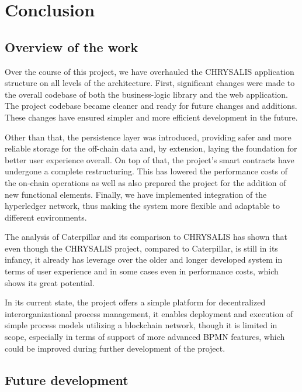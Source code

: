 %
\chapter{Conclusion}
\label{sec:conclusion}

\section{Overview of the work}
\label{sec:conclusion:overview}
Over the course of this project, we have overhauled the CHRYSALIS application structure on all levels of the architecture. First, significant changes were made to the overall codebase of both the business-logic library and the web application. The project codebase became cleaner and ready for future changes and additions. These changes have ensured simpler and more efficient development in the future.

Other than that, the persistence layer was introduced, providing safer and more reliable storage for the off-chain data and, by extension, laying the  foundation for better user experience overall. On top of that, the project's smart contracts have undergone a complete restructuring. This has lowered the performance costs of the on-chain operations as well as also prepared the project for the addition of new functional elements. Finally, we have implemented integration of the hyperledger network, thus making the system more flexible and adaptable to different environments.

The analysis of Caterpillar and its comparison to CHRYSALIS has shown that even though the CHRYSALIS project, compared to Caterpillar, is still in its infancy, it already has leverage over the older and longer developed system in terms of user experience and in some cases even in performance costs, which shows its great potential.

In its current state, the project offers a simple platform for decentralized interorganizational process management, it enables deployment and execution of simple process models utilizing a blockchain network, though it is limited in scope, especially in terms of support of more advanced BPMN features, which could be improved during further development of the project.

\section{Future development}
\label{sec:conclusion:future}

